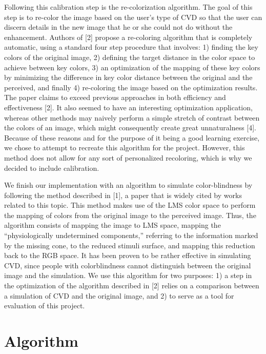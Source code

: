 \documentclass[10pt,twocolumn,letterpaper]{article}
\begin{document}
	Following this calibration step is the re-colorization algorithm. The goal of this step is to re-color the image based on the user’s type of CVD so that the user can discern details in the new image that he or she could not do without the enhancement. Authors of [2] propose a re-coloring algorithm that is completely automatic, using a standard four step procedure that involves: 1) finding the key colors of the original image, 2) defining the target distance in the color space to achieve between key colors, 3) an optimization of the mapping of these key colors by minimizing the difference in key color distance between the original and the perceived, and finally 4) re-coloring the image based on the optimization results. The paper claims to exceed previous approaches in both efficiency and effectiveness [2]. It also seemed to have an interesting optimization application, whereas other methods may naively perform a simple stretch of contrast between the colors of an image, which might consequently create great unnaturalness [4]. Because of these reasons and for the purpose of it being a good learning exercise, we chose to attempt to recreate this algorithm for the project. However, this method does not allow for any sort of personalized recoloring, which is why we decided to include calibration. 

	We finish our implementation with an algorithm to simulate color-blindness by following the method described in [1], a paper that is widely cited by works related to this topic. This method makes use of the LMS color space to perform the mapping of colors from the original image to the perceived image. Thus, the algorithm consists of mapping the image to LMS space, mapping the “physiologically undetermined components,” referring to the information marked by the missing cone, to the reduced stimuli surface, and mapping this reduction back to the RGB space. It has been proven to be rather effective in simulating CVD, since people with colorblindness cannot distinguish between the original image and the simulation. We use this algorithm for two purposes: 1) a step in the optimization of the algorithm described in [2] relies on a comparison between a simulation of CVD and the original image, and 2) to serve as a tool for evaluation of this project. 

\section{Algorithm}
\end{document}
